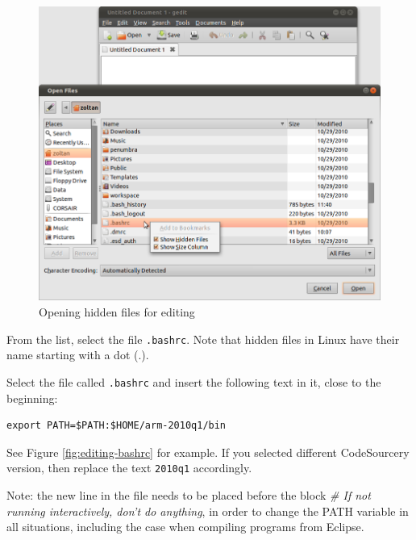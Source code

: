 \documentclass[a4paper, 10pt]{article}
\begin{document}
    \begin{figure}[H]
    \centering
        \includegraphics[width=\textwidth]{./png-install-guide/show-all-files.png}
        \caption{Opening hidden files for editing}
        \label{fig:show-hidden-files}
    \end{figure}

From the list, select the file \verb+.bashrc+. Note that hidden files in Linux
have their name starting with a dot (.).

Select the file called \verb+.bashrc+ and insert the following text in it,
close to the beginning:

\begin{verbatim}
export PATH=$PATH:$HOME/arm-2010q1/bin
\end{verbatim}

See Figure \ref{fig:editing-bashrc} for example. If you selected different CodeSourcery version,
then replace the text \verb+2010q1+ accordingly.

Note: the new line in the file needs to be placed before the block
\emph{\# If not running interactively, don't do anything},
in order to change the PATH variable in all situations,
including the case when compiling programs from Eclipse.
\end{document}
